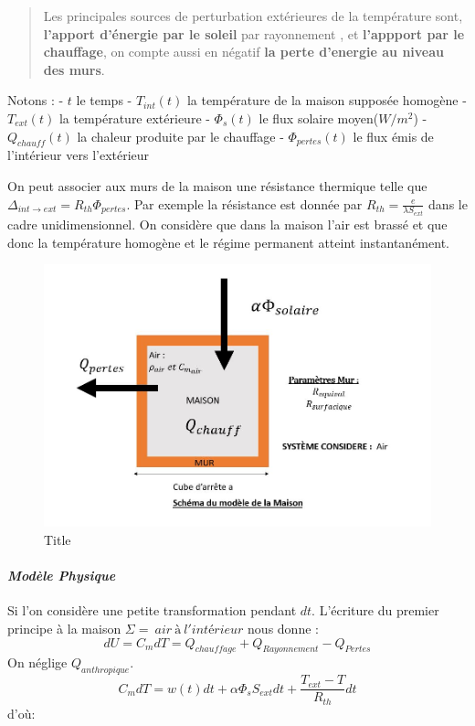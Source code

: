 \documentclass[11pt]{article}
\begin{document}
\begin{quote}
Les principales sources de perturbation extérieures de la température
sont, \textbf{l'apport d'énergie par le soleil} par rayonnement , et
\textbf{l'appport par le chauffage}, on compte aussi en négatif
\textbf{la perte d'energie au niveau des murs}.
\end{quote}

Notons : - \(t\) le temps - \(T_{int}(t)\) la température de la maison
supposée homogène - \(T_{ext}(t)\) la température extérieure -
\(\Phi_s(t)\) le flux solaire moyen(\(W/m^2\)) - \(Q_{chauff}(t)\) la
chaleur produite par le chauffage - \(\Phi_{pertes}(t)\) le flux émis de
l'intérieur vers l'extérieur

On peut associer aux murs de la maison une résistance thermique telle
que \(\Delta_{int\to ext} = R_{th}\Phi_{pertes}\). Par exemple la
résistance est donnée par \(R_{th} = \frac{e}{\lambda S_{ext}}\) dans le
cadre unidimensionnel. On considère que dans la maison l'air est brassé
et que donc la température homogène et le régime permanent atteint
instantanément.

\begin{figure}
\centering
\includegraphics{modele.JPG}
\caption{Title}
\end{figure}

\hypertarget{moduxe8le-physique}{%
\paragraph{\texorpdfstring{\emph{\textbf{Modèle
Physique}}}{Modèle Physique}}\label{moduxe8le-physique}}

Si l'on considère une petite transformation pendant \(dt\). L'écriture
du premier principe à la maison \(\Sigma = { \ air \ à \ l'intérieur}\)
nous donne :
\[dU = C_{m}dT = Q_{chauffage} + Q_{Rayonnement} - Q_{Pertes}\] On
néglige \(Q_{anthropique}\).
\[C_{m}dT = w(t)dt + \alpha \Phi_sS_{ext}dt + \frac{T_{ext}-T}{R_{th}}dt\]
d'où:
\end{document}
